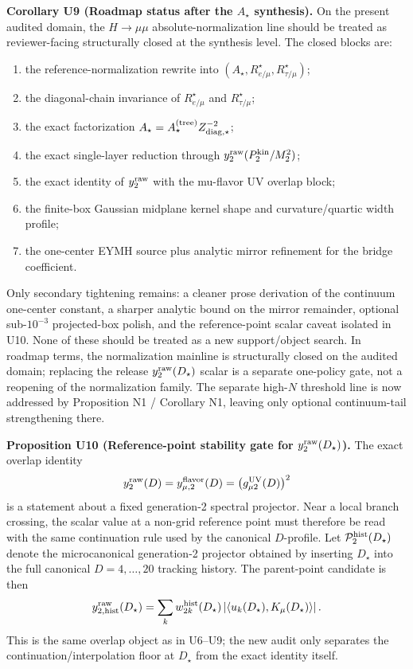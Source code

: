 \documentclass[aps,prd,onecolumn,notitlepage,nofootinbib,superscriptaddress,11pt,floatfix]{revtex4-2}
\begin{document}
\medskip\noindent\textbf{Corollary U9 (Roadmap status after the \texorpdfstring{$A_\star$}{A*} synthesis).}
On the present audited domain, the \(H\to\mu\mu\) absolute-normalization line should be treated as reviewer-facing structurally closed at the synthesis level.  The closed blocks are:
\begin{enumerate}
\item the reference-normalization rewrite into \((A_\star,R_{e/\mu}^\star,R_{\tau/\mu}^\star)\);
\item the diagonal-chain invariance of \(R_{e/\mu}^\star\) and \(R_{\tau/\mu}^\star\);
\item the exact factorization \(A_\star=A_\star^{\rm(tree)}Z_{{\rm diag},\star}^{-2}\);
\item the exact single-layer reduction through \(y_2^{\rm raw}(P_2^{\rm kin}/M_2^2)\);
\item the exact identity of \(y_2^{\rm raw}\) with the mu-flavor UV overlap block;
\item the finite-box Gaussian midplane kernel shape and curvature/quartic width profile;
\item the one-center EYMH source plus analytic mirror refinement for the bridge coefficient.
\end{enumerate}
Only secondary tightening remains: a cleaner prose derivation of the continuum one-center constant, a sharper analytic bound on the mirror remainder, optional sub-\(10^{-3}\) projected-box polish, and the reference-point scalar caveat isolated in U10.  None of these should be treated as a new support/object search.  In roadmap terms, the normalization mainline is structurally closed on the audited domain; replacing the release \(y_2^{\rm raw}(D_\star)\) scalar is a separate one-policy gate, not a reopening of the normalization family.  The separate high-\(N\) threshold line is now addressed by Proposition N1 / Corollary N1, leaving only optional continuum-tail strengthening there.

\medskip\noindent\textbf{Proposition U10 (Reference-point stability gate for \texorpdfstring{$y_2^{\rm raw}(D_\star)$}{y2raw(D*)}).}
The exact overlap identity
\[
y_2^{\rm raw}(D)
=
y_{\mu,2}^{\rm flavor}(D)
=
\bigl(g_{\mu2}^{\rm UV}(D)\bigr)^2
\]
is a statement about a fixed generation-2 spectral projector.  Near a local branch crossing, the scalar value at a non-grid reference point must therefore be read with the same continuation rule used by the canonical \(D\)-profile.  Let \(\mathcal P_2^{\rm hist}(D_\star)\) denote the microcanonical generation-2 projector obtained by inserting \(D_\star\) into the full canonical \(D=4,\ldots,20\) tracking history.  The parent-point candidate is then
\[
y_{2,{\rm hist}}^{\rm raw}(D_\star)
=
\sum_k w_{2k}^{\rm hist}(D_\star)
\left|\left\langle u_k(D_\star),K_\mu(D_\star)\right\rangle\right|.
\]
This is the same overlap object as in U6--U9; the new audit only separates the continuation/interpolation floor at \(D_\star\) from the exact identity itself.
\end{document}
